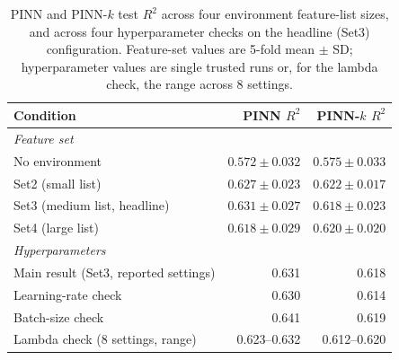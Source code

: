 \begin{table}[!htbp]
\centering
\scriptsize
\begin{tabular}{lrr}
\toprule
Condition & PINN $R^2$ & PINN-$k$ $R^2$ \\
\midrule
\multicolumn{3}{l}{\textit{Feature set}} \\
No environment & $0.572\pm0.032$ & $0.575\pm0.033$ \\
Set2 (small list) & $0.627\pm0.023$ & $0.622\pm0.017$ \\
Set3 (medium list, headline) & $0.631\pm0.027$ & $0.618\pm0.023$ \\
Set4 (large list) & $0.618\pm0.029$ & $0.620\pm0.020$ \\
\midrule
\multicolumn{3}{l}{\textit{Hyperparameters}} \\
Main result (Set3, reported settings) & 0.631 & 0.618 \\
Learning-rate check & 0.630 & 0.614 \\
Batch-size check & 0.641 & 0.619 \\
Lambda check (8 settings, range) & 0.623--0.632 & 0.612--0.620 \\
\bottomrule
\end{tabular}
\caption{\small{PINN and PINN-$k$ test $R^2$ across four environment feature-list sizes, and
across four hyperparameter checks on the headline (Set3) configuration. Feature-set values are
5-fold mean $\pm$ SD; hyperparameter values are single trusted runs or, for the lambda check,
the range across 8 settings.}} %
\label{tab:pinn-conditions}
\end{table}


